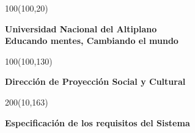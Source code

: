 

\begin{titlepage}
    
    

    \begin{textblock}{100}(100,20)
        \begin{flushright}
        {\huge{\textbf{Universidad Nacional del Altiplano}}}\\
        {\normalsize{\textbf{Educando mentes, Cambiando el mundo}}}
        \end{flushright}
        
    \end{textblock}
    

    \begin{textblock}{100}(100,130)
        \begin{flushright}
            {\Large{\textbf{Dirección de Proyección Social y Cultural }}}\\[10pt]
        \end{flushright}
    \end{textblock}

    \begin{textblock}{200}(10,163)
        \begin{center}
            
            {\LARGE {\textbf{ Especificación de los requisitos del Sistema }}} \par


\end{center}
\end{textblock}
\end{titlepage}
